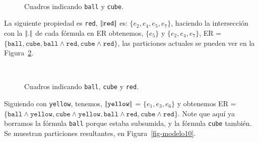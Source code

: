 \begin{figure}[ht]
\begin{center}
\\[0pt]
\caption{Cuadros indicando \texttt{ball} y \texttt{cube}.}
\label{fig-modelo4}
\end{center}
\end{figure}
La siguiente propiedad es \texttt{red}, 
$|\!|\texttt{red}|\!|$ es: $\{e_2, e_4, e_5, e_7\}$, haciendo la intersecci\'on con la $|\!|.|\!|$ de cada f\'ormula en ER obtenemos, 
$\{e_5\}$ y $\{e_2, e_4, e_7\}$, ER = $\{\texttt{ball}, \texttt{cube}, \texttt{ball} \wedge \texttt{red}, \texttt{cube} \wedge \texttt{red}\}$, 
las particiones actuales se pueden ver en la Figura~\ref{fig-modelo9}.

\begin{figure}[ht]
\begin{center}
\\[0pt]
\caption{Cuadros indicando \texttt{ball}, \texttt{cube} y \texttt{red}.}
\label{fig-modelo9}
\end{center}
\end{figure}
%
Siguiendo con \texttt{yellow}, tenemos, $|\!|\texttt{yellow}|\!|$ = $\{e_1, e_3, e_6\}$ y obtenemos ER = $\{\texttt{ball} \wedge \texttt{yellow}, 
\texttt{cube} \wedge \texttt{yellow}, \texttt{ball} \wedge \texttt{red}, \texttt{cube} \wedge \texttt{red}\}$. 
Note que aqu\'i ya borramos la f\'ormula \texttt{ball} porque estaba subsumida, y la f\'ormula \texttt{cube} tambi\'en. 
Se muestran particiones resultantes, en Figura~\ref{fig-modelo10}.

